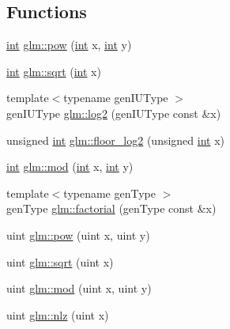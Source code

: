 \subsection*{Functions}
\begin{DoxyCompactItemize}
\item 
\hyperlink{_s_d_l__thread_8h_a6a64f9be4433e4de6e2f2f548cf3c08e}{int} \hyperlink{group__gtx__integer_ga9642514a44a67afa70966d756f040ca9}{glm\+::pow} (\hyperlink{_s_d_l__thread_8h_a6a64f9be4433e4de6e2f2f548cf3c08e}{int} x, \hyperlink{_s_d_l__thread_8h_a6a64f9be4433e4de6e2f2f548cf3c08e}{int} y)
\item 
\hyperlink{_s_d_l__thread_8h_a6a64f9be4433e4de6e2f2f548cf3c08e}{int} \hyperlink{group__gtx__integer_ga78e2e68330e91d350fcfc2f4831cad12}{glm\+::sqrt} (\hyperlink{_s_d_l__thread_8h_a6a64f9be4433e4de6e2f2f548cf3c08e}{int} x)
\item 
{\footnotesize template$<$typename gen\+I\+U\+Type $>$ }\\gen\+I\+U\+Type \hyperlink{group__gtx__integer_gae6836e4b1445f55ab30f32e3da36c284}{glm\+::log2} (gen\+I\+U\+Type const \&x)
\item 
unsigned \hyperlink{_s_d_l__thread_8h_a6a64f9be4433e4de6e2f2f548cf3c08e}{int} \hyperlink{group__gtx__integer_ga054b9fd24e0d18af9ae7e9b6bfb5a2c9}{glm\+::floor\+\_\+log2} (unsigned \hyperlink{_s_d_l__thread_8h_a6a64f9be4433e4de6e2f2f548cf3c08e}{int} x)
\item 
\hyperlink{_s_d_l__thread_8h_a6a64f9be4433e4de6e2f2f548cf3c08e}{int} \hyperlink{group__gtx__integer_gab9d22df91aac4d9eb925a4910f556f1b}{glm\+::mod} (\hyperlink{_s_d_l__thread_8h_a6a64f9be4433e4de6e2f2f548cf3c08e}{int} x, \hyperlink{_s_d_l__thread_8h_a6a64f9be4433e4de6e2f2f548cf3c08e}{int} y)
\item 
{\footnotesize template$<$typename gen\+Type $>$ }\\gen\+Type \hyperlink{group__gtx__integer_ga6912d62d2f314fa38ef4c94fda778294}{glm\+::factorial} (gen\+Type const \&x)
\item 
uint \hyperlink{group__gtx__integer_gaa8229e850c3cc4ad83492fe390ada044}{glm\+::pow} (uint x, uint y)
\item 
uint \hyperlink{group__gtx__integer_ga457e9efca8339bf918d319e9c55f7c8f}{glm\+::sqrt} (uint x)
\item 
uint \hyperlink{group__gtx__integer_gab8f9ec0ca93ca90669434224818f0750}{glm\+::mod} (uint x, uint y)
\item 
uint \hyperlink{group__gtx__integer_gacbe62fd2384464c16ea30ecc4defc11c}{glm\+::nlz} (uint x)
\end{DoxyCompactItemize}


